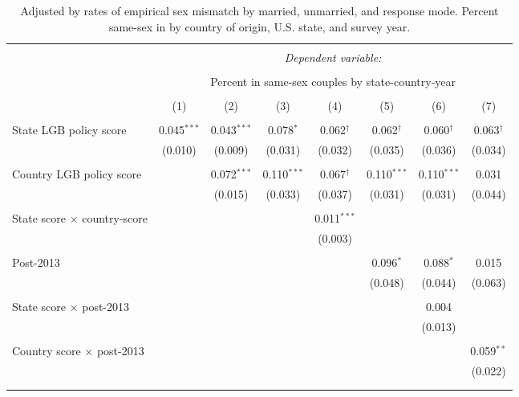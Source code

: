 \documentclass[
  11pt,
]{article}
\begin{document}
\begin{table}[H] \centering 
  \caption{Adjusted by rates of empirical sex mismatch by married, unmarried, and response mode. Percent same-sex in by country of origin, U.S. state, and survey year.} 
  \label{tab:state-props-adj} 
\begin{tabular}{@{\extracolsep{5pt}}lccccccc} 
\\[-1.8ex]\hline 
\hline \\[-1.8ex] 
 & \multicolumn{7}{c}{\textit{Dependent variable:}} \\ 
\cline{2-8} 
\\[-1.8ex] & \multicolumn{7}{c}{Percent in same-sex couples by state-country-year} \\ 
\\[-1.8ex] & (1) & (2) & (3) & (4) & (5) & (6) & (7)\\ 
\hline \\[-1.8ex] 
 State LGB policy score & 0.045$^{***}$ & 0.043$^{***}$ & 0.078$^{*}$ & 0.062$^{†}$ & 0.062$^{†}$ & 0.060$^{†}$ & 0.063$^{†}$ \\ 
  & (0.010) & (0.009) & (0.031) & (0.032) & (0.035) & (0.036) & (0.034) \\ 
  & & & & & & & \\ 
 Country LGB policy score &  & 0.072$^{***}$ & 0.110$^{***}$ & 0.067$^{†}$ & 0.110$^{***}$ & 0.110$^{***}$ & 0.031 \\ 
  &  & (0.015) & (0.033) & (0.037) & (0.031) & (0.031) & (0.044) \\ 
  & & & & & & & \\ 
 State score × country-score &  &  &  & 0.011$^{***}$ &  &  &  \\ 
  &  &  &  & (0.003) &  &  &  \\ 
  & & & & & & & \\ 
 Post-2013 &  &  &  &  & 0.096$^{*}$ & 0.088$^{*}$ & 0.015 \\ 
  &  &  &  &  & (0.048) & (0.044) & (0.063) \\ 
  & & & & & & & \\ 
 State score × post-2013 &  &  &  &  &  & 0.004 &  \\ 
  &  &  &  &  &  & (0.013) &  \\ 
  & & & & & & & \\ 
 Country score × post-2013 &  &  &  &  &  &  & 0.059$^{**}$ \\ 
  &  &  &  &  &  &  & (0.022) \\ 
  & & & & & & & \\ 
\hline \\[-1.8ex] 

\end{tabular}
\end{table}
\end{document}
